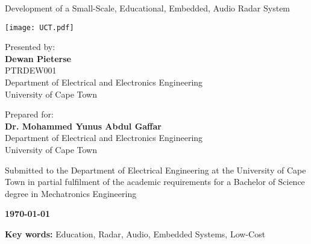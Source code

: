 \thispagestyle{empty}
{\Huge 
\begin{center}
    Development of a Small-Scale, Educational, Embedded, Audio Radar System
\end{center}}

\vskip 5mm
\begin{center}
    \texttt{[image: UCT.pdf]}
\end{center}

\vskip 5mm
\begin{center}
    Presented by:\\
    \textbf{Dewan Pieterse}\\
    PTRDEW001\\
    Department of Electrical and Electronics Engineering\\
    University of Cape Town
\end{center}

\vskip 10mm
\begin{center}
Prepared for:\\
    \textbf{Dr. Mohammed Yunus Abdul Gaffar}\\ %
    Department of Electrical and Electronics Engineering\\
    University of Cape Town
\end{center}

\vskip 10mm
\begin{center}{\scriptsize
Submitted to the Department of Electrical Engineering at the University of Cape Town in partial fulfilment of the academic requirements for a Bachelor of Science degree in Mechatronics Engineering}
\end{center}

\vskip 5mm
\begin{center}{\bf \today}\end{center}

\begin{center}\textbf{Key words:} Education, Radar, Audio, Embedded Systems, Low-Cost\end{center}\newpage